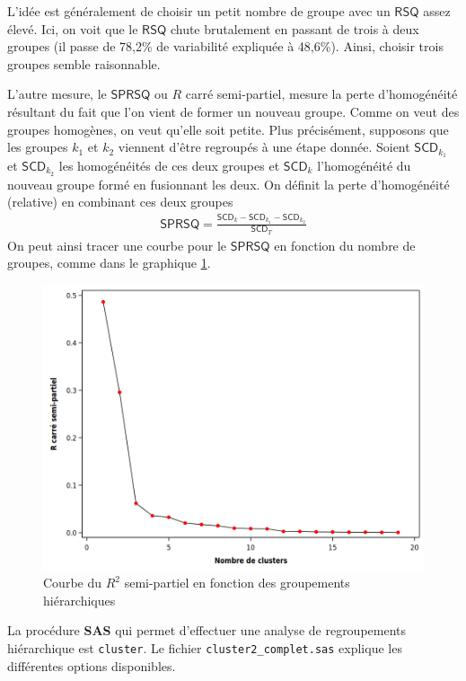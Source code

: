 \documentclass[
  11pt,
  letterpaper,
]{book}
\theoremstyle{definition}
\theoremstyle{definition}
\theoremstyle{definition}
\theoremstyle{definition}
\theoremstyle{remark}
\begin{document}
L'idée est généralement de choisir un petit nombre de groupe avec un \(\mathsf{RSQ}\) assez élevé.
Ici, on voit que le \(\mathsf{RSQ}\) chute brutalement en passant de trois à deux groupes (il passe de 78,2\% de variabilité expliquée à 48,6\%). Ainsi, choisir trois groupes semble raisonnable.

L'autre mesure, le \(\mathsf{SPRSQ}\) ou \(R\) carré semi-partiel, mesure la perte d'homogénéité résultant du fait que l'on vient de former un nouveau groupe. Comme on veut des groupes homogènes, on veut qu'elle soit petite. Plus précisément, supposons que les groupes \(k_1\) et \(k_2\) viennent d'être regroupés à une étape donnée. Soient \(\mathsf{SCD}_{k_1}\) et \(\mathsf{SCD}_{k_2}\) les homogénéités de ces deux groupes et \(\mathsf{SCD}_{k}\) l'homogénéité du nouveau groupe formé en fusionnant les deux.
On définit la perte d'homogénéité (relative) en combinant ces deux groupes
\begin{align*}
\mathsf{SPRSQ} = \frac{\mathsf{SCD}_k - \mathsf{SCD}_{k_1} - \mathsf{SCD}_{k_2}}{\mathsf{SCD}_T}
\end{align*}
On peut ainsi tracer une courbe pour le \(\mathsf{SPRSQ}\) en fonction du nombre de groupes, comme dans le graphique \ref{fig:fig4-e5}.

\begin{figure}

{\centering \includegraphics[width=0.8\linewidth]{figures/04-clustering-e5} 

}

\caption{Courbe du $R^2$ semi-partiel en fonction des groupements hiérarchiques}\label{fig:fig4-e5}
\end{figure}

La procédure \textbf{SAS} qui permet d'effectuer une analyse de regroupements hiérarchique est \texttt{cluster}. Le fichier \texttt{cluster2\_complet.sas} explique les différentes options disponibles.
\end{document}
